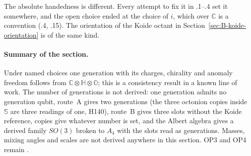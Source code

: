 The absolute handedness is different. Every attempt to fix it in .1--.4 set it somewhere, and the open choice
ended at the choice of $i$, which over $\mathbb C$ is a convention (.4, .15). The orientation of the
Koide octant in Section~\ref{sec:B-koide-orientation} is of the same kind.

\paragraph{Summary of the section.}
Under named choices one generation with its charges, chirality and anomaly freedom follows from $\mathbb C\otimes\mathbb H
\otimes\mathbb O$; this is a consistency result in a known line of work. The number of generations is not derived: one
generation admits no generation qubit, route~A gives two generations (the three octonion copies inside $\mathbb S$ are three
readings of one, H140), route~B gives three slots without the Koide
reference, copies give whatever number is set, and the Albert algebra gives a derived family $SO(3)$ broken to $A_4$ with
the slots read as generations. Masses, mixing angles and scales are not derived anywhere in this section. OP3 and OP4 remain
\Open.
